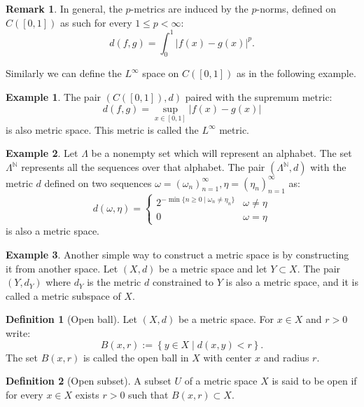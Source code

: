 \documentclass[11pt,a4paper]{article}
\theoremstyle{definition}
\newtheorem{definition}{Definition}[section]
\newtheorem{remark}{Remark}[section]
\newtheorem{example}{Example}[section]
\theoremstyle{plain}
\newcommand{\N}{\mathbb{N}}
\newcommand{\set}[2]{ \left\{ #1 \mid #2 \right\} }
\newcommand{\abs}[1]{\left\lvert #1\right\rvert}
\begin{document}
  \begin{remark}
    In general, the $p$-metrics are induced by the $p$-norms, defined
    on $C\left([0,1]\right)$ as such for every $1 \le p < \infty$:
    \[
      d(f,g) = \int_{0}^{1}{\abs{f(x) - g(x)}^p}.
    \]
  \end{remark}
  Similarly we can define the $L^\infty$ space on $C\left([0,1]\right)$
  as in the following example.
  \begin{example}
  The pair $(C([0,1]), d)$ paired with the supremum metric:
  \[
    d(f,g) = \sup_{x \in [0,1]}{\abs{f(x) - g(x)}}
  \]
  is also metric space. This metric is called the $L^\infty$ metric.
  \end{example}
  
  \begin{example}
  Let $\Lambda$ be a nonempty set which will represent an alphabet.
  The set $\Lambda^{\N}$ represents all the sequences over that alphabet.
  The pair $(\Lambda^\N, d)$ with the metric $d$ defined on two sequences
  $\omega = (\omega_n)_{n=1}^{\infty}, \eta = (\eta_n)_{n=1}^{\infty}$
  as:
  \[
    d(\omega, \eta) = \begin{cases}
      2^{-\min\{n \geq 0 \mid \omega_n \neq \eta_n\}} & 
      \omega \neq \eta \\
      0 & \omega = \eta
    \end{cases}
  \]
  is also a metric space.
  \end{example}
  \begin{example}
    Another simple way to construct a metric space is by constructing it
    from another space. Let $(X,d)$ be a metric space and let $Y \subset X$.
    The pair $(Y,d_Y)$ where $d_Y$ is the metric $d$ constrained to $Y$
    is also a metric space, and it is called a metric subspace of $X$.
  \end{example}
  
  \begin{definition}[Open ball]
    Let $(X,d)$ be a metric space. For $x \in X$ and $r > 0$ write:
    \[
      B(x,r) := \set{y \in X}{d(x,y) < r}.
    \]
    The set $B(x,r)$ is called the open ball in $X$ with center $x$
    and radius $r$.
  \end{definition}
  
  \begin{definition}[Open subset]
    A subset $U$ of a metric space $X$ is said to be open if for every
    $x \in X$ exists $r > 0$ such that $B(x,r) \subset X$.
  \end{definition}
\end{document}
